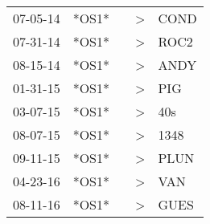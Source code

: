 \begin{supertabular}{lllll}
 07-05-14 &  *OS1* &   &  \textgreater &  COND \\
 07-31-14 &  *OS1* &   &  \textgreater &  ROC2 \\
 08-15-14 &  *OS1* &   &  \textgreater &  ANDY \\
 01-31-15 &  *OS1* &   &  \textgreater &   PIG \\
 03-07-15 &  *OS1* &   &  \textgreater &   40s \\
 08-07-15 &  *OS1* &   &  \textgreater &  1348 \\
 09-11-15 &  *OS1* &   &  \textgreater &  PLUN \\
 04-23-16 &  *OS1* &   &  \textgreater &   VAN \\
 08-11-16 &  *OS1* &   &  \textgreater &  GUES \\
\end{supertabular}
